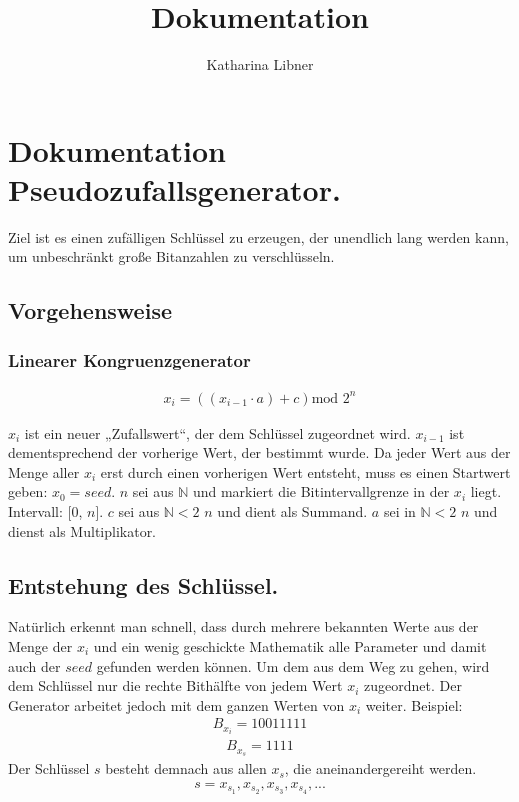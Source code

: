 \documentclass[10pt,a4paper]{article}
\author{Katharina Libner}
\title{Dokumentation}
\begin{document}
\maketitle
\tableofcontents
\newpage

\section{Dokumentation Pseudozufallsgenerator.}
Ziel ist es einen \glqq zufälligen\grqq{} Schlüssel zu erzeugen, der unendlich lang werden kann, um unbeschränkt große Bitanzahlen zu verschlüsseln.
\subsection{Vorgehensweise}

\subsubsection{Linearer Kongruenzgenerator}
\begin{align*}
    x_i=\left(\left( x_{i-1}\cdot a\right) +c\right) \text{mod } 2^n
\end{align*}

$x_i$ ist ein neuer „Zufallswert“, der dem Schlüssel zugeordnet wird.
$x_{i-1}$ ist dementsprechend der vorherige Wert, der bestimmt wurde.
Da jeder Wert aus der Menge aller $x_i$ erst durch einen vorherigen Wert entsteht, muss es einen
Startwert geben: $x_0 = seed $.
$n$ sei aus $ \mathbb{N} $ und markiert die Bitintervallgrenze in der $x_i$
liegt. Intervall: [0, $n$].
$c$ sei aus  $ \mathbb{N}<2 $
$n$ und dient als Summand.
$a$ sei in $ \mathbb{N}< 2 $
$n$ und dienst als Multiplikator.
\subsection{Entstehung des Schlüssel.}
Natürlich erkennt man schnell, dass durch mehrere bekannten Werte aus der Menge der $x_i$ und ein wenig geschickte Mathematik alle Parameter und damit auch der $seed$ gefunden werden können. Um dem aus dem Weg zu gehen, wird dem Schlüssel nur die rechte Bithälfte von jedem Wert $x_i$ zugeordnet. Der Generator arbeitet jedoch mit dem ganzen Werten von $x_i$ weiter. Beispiel:
\begin{align*}
    B_{x_i} = 1001 1111
\end{align*}
\begin{align*}
    B_{x_s} = 1111
\end{align*}
Der Schlüssel $s$ besteht demnach aus allen $x_s$, die aneinandergereiht werden.
\begin{align*}
    s = x_{s_1}, x_{s_2}, x_{s_3}, x_{s_4}, ...
\end{align*}
\end{document}
